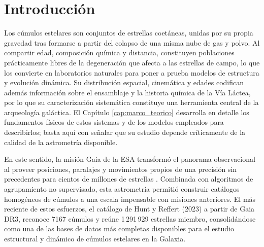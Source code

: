 
\chapter{Introducción} 
\label{cap:introduccion}

    Los cúmulos estelares son conjuntos de estrellas coetáneas, unidas por su 
    propia gravedad tras formarse a partir del colapso de una misma nube de gas 
    y polvo. Al compartir edad, composición química y distancia, constituyen 
    poblaciones prácticamente libres de la degeneración que afecta a las 
    estrellas de campo, lo que los convierte en laboratorios naturales para 
    poner a prueba modelos de estructura y evolución dinámica. Su distribución 
    espacial, cinemática y edades codifican además información sobre el 
    ensamblaje y la historia química de la Vía Láctea, por lo que su 
    caracterización sistemática constituye una herramienta central de la 
    arqueología galáctica. El Capítulo \ref{cap:marco_teorico} desarrolla en 
    detalle los fundamentos físicos de estos sistemas y de los modelos 
    empleados para describirlos; basta aquí con señalar que su estudio depende 
    críticamente de la calidad de la astrometría disponible.

    En este sentido, la misión Gaia de la ESA transformó el panorama 
    observacional al proveer posiciones, paralajes y movimientos propios de una 
    precisión sin precedentes para cientos de millones de estrellas 
    \cite{Brown2018}. Combinada con algoritmos de agrupamiento no supervisado, 
    esta astrometría permitió construir catálogos homogéneos de cúmulos a una 
    escala impensable con misiones anteriores. El más reciente de estos 
    esfuerzos, el catálogo de Hunt y Reffert (2023) \cite{hunt2023improving} a 
    partir de Gaia DR3, reconoce 7167 cúmulos y reúne 1\,291\,929 estrellas 
    miembro, consolidándose como una de las bases de datos más completas 
    disponibles para el estudio estructural y dinámico de cúmulos estelares en 
    la Galaxia.

